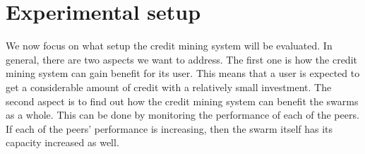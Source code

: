 \section{Experimental setup}
\label{section:cmexp}
We now focus on what setup the credit mining system will be evaluated. In general, there are two aspects we want to address. The first one is how the credit mining system can gain benefit for its user. This means that a user is expected to get a considerable amount of credit with a relatively small investment. The second aspect is to find out how the credit mining system can benefit the swarms as a whole. This can be done by monitoring the performance of each of the peers. If each of the peers' performance is increasing, then the swarm itself has its capacity increased as well.



